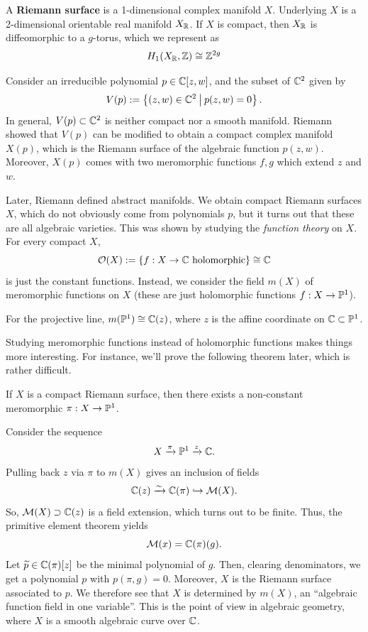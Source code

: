 \documentclass[11pt]{article}
\begin{document}
\begin{defn}
    A \textbf{Riemann surface} is a 1-dimensional complex manifold $X$. Underlying $X$ is a 2-dimensional orientable real manifold $X_\R$. If $X$ is compact, then $X_\R$ is diffeomorphic to a $g$-torus, which we represent as
    $$H_1(X_\R, \Z) \cong \Z^{2g}$$
\end{defn}

Consider an irreducible polynomial $p \in \C[z,w]$, and the subset of $\C^2$ given by
$$V(p):= \brax{(z,w) \in \C^2 \setbar p(z,w) =0}.$$
In general, $V(p) \subset \C^2$ is neither compact nor a smooth manifold. Riemann showed that $V(p)$ can be modified to obtain a compact complex manifold $X(p)$, which is the Riemann surface of the algebraic function $p(z,w)$. Moreover, $X(p)$ comes with two meromorphic functions $f,g$ which extend $z$ and $w$.

Later, Riemann defined abstract manifolds. We obtain compact Riemann surfaces $X$, which do not obviously come from polynomials $p$, but it turns out that these are all algebraic varieties. This was shown by studying the \textit{function theory} on $X$. For every compact $X$,
$$\mc O(X) := \{ f:X \to \C \text{ holomorphic}\} \cong \C$$
is just the constant functions. Instead, we consider the field $m(X)$ of meromorphic functions on $X$ (these are just holomorphic functions $f:X \to \P^1$).

\begin{ex}
    For the projective line, $m(\P^1) \cong \C(z)$, where $z$ is the affine coordinate on $\C \subset \P^1$.
\end{ex}

Studying meromorphic functions instead of holomorphic functions makes things more interesting. For instance, we'll prove the following theorem later, which is rather difficult.
\begin{thm}
    If $X$ is a compact Riemann surface, then there exists a non-constant meromorphic $\pi : X \to \P^1$.
\end{thm}

Consider the sequence
$$X \arr[\pi] \P^1 \arr[z]\C.$$
Pulling back $z$ via $\pi$ to $m(X)$ gives an inclusion of fields
$$\C(z) \arr[\sim] \C(\pi) \hookrightarrow \mc M(X).$$
So, $\mc M(X) \supset \C(z)$ is a field extension, which turns out to be finite. Thus, the primitive element theorem yields
$$\mc M(x) = \C(\pi)(g).$$
Let $\tilde p \in \C(\pi)[z]$ be the minimal polynomial of $g$. Then, clearing denominators, we get a polynomial $p$ with $p(\pi,g)=0$. Moreover, $X$ is the Riemann surface associated to $p$. We therefore see that $X$ is determined by $m(X)$, an ``algebraic function field in one variable''. This is the point of view in algebraic geometry, where $X$ is a smooth algebraic curve over $\C$.
\end{document}

